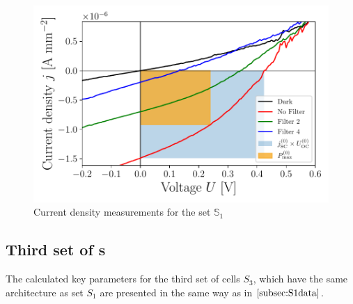 \documentclass[a4paper,10pt,twocolumn]{article}
\begin{document}
\begin{extract*}
\begin{figure}[h]\centering
	\includegraphics[width=\columnwidth]{../../../IV-Curve-Analysis/OSC1Graph.pdf}
	\caption{Current density measurements for the set $\mathbb{S}_1$}
	\label{fig:OSC1Graph}
\end{figure}

\subsection{Third set of \BHSC s}

The calculated key parameters for the third set of cells $S_3$, which have the same architecture as set $S_1$ are presented in the same way as in $\ref{subsec:S1data}$.


\end{extract*}
\end{document}
